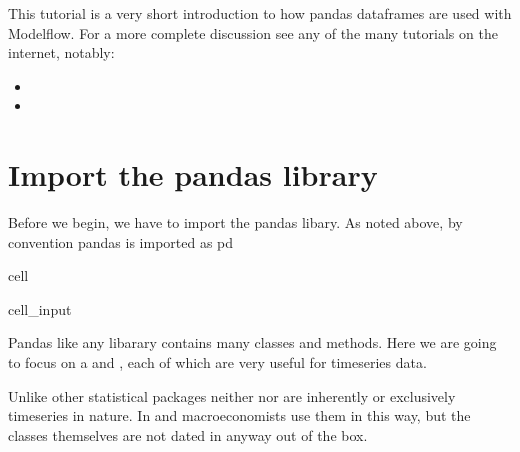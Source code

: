 \documentclass[letterpaper,10pt,english]{jupyterBook}
\begin{document}
\sphinxAtStartPar
This tutorial is a very short introduction to how pandas dataframes are used with Modelflow. For a more complete discussion see any of the many tutorials on the internet, notably:
\begin{itemize}
\item {} 
\sphinxAtStartPar
{}

\item {} 
\sphinxAtStartPar
{}

\end{itemize}


\chapter{Import the pandas library}
\label{\detokenize{content/04_PythonEssentials/PythonPackagesEtc:import-the-pandas-library}}
\sphinxAtStartPar
Before we begin, we have to import the pandas libary.  As noted above, by  convention pandas is imported as pd

\begin{sphinxuseclass}{cell}\begin{sphinxVerbatimInput}

\begin{sphinxuseclass}{cell_input}
\begin{sphinxVerbatim}[commandchars=\\\{\}]
    
\end{sphinxVerbatim}

\end{sphinxuseclass}\end{sphinxVerbatimInput}

\end{sphinxuseclass}
\sphinxAtStartPar
Pandas like any libarary contains many classes and methods.  Here we are going to focus on a  and , each of which are very useful for time\sphinxhyphen{}series data.

\sphinxAtStartPar
Unlike other statistical packages neither  nor  are inherently or exclusively time\sphinxhyphen{}series in nature.  In  and macroeconomists use them in this way, but the classes themselves are not dated in anyway out of the box.
\end{document}
